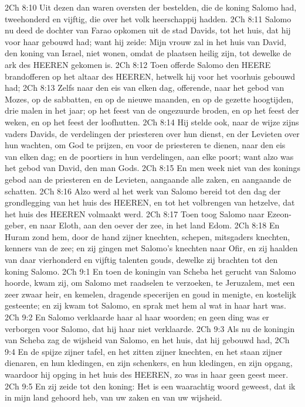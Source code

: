 2Ch 8:10  Uit dezen dan waren oversten der bestelden, die de koning Salomo had, tweehonderd en vijftig, die over het volk heerschappij hadden.
2Ch 8:11  Salomo nu deed de dochter van Farao opkomen uit de stad Davids, tot het huis, dat hij voor haar gebouwd had; want hij zeide: Mijn vrouw zal in het huis van David, den koning van Israel, niet wonen, omdat de plaatsen heilig zijn, tot dewelke de ark des HEEREN gekomen is.
2Ch 8:12  Toen offerde Salomo den HEERE brandofferen op het altaar des HEEREN, hetwelk hij voor het voorhuis gebouwd had;
2Ch 8:13  Zelfs naar den eis van elken dag, offerende, naar het gebod van Mozes, op de sabbatten, en op de nieuwe maanden, en op de gezette hoogtijden, drie malen in het jaar; op het feest van de ongezuurde broden, en op het feest der weken, en op het feest der loofhutten.
2Ch 8:14  Hij stelde ook, naar de wijze zijns vaders Davids, de verdelingen der priesteren over hun dienst, en der Levieten over hun wachten, om God te prijzen, en voor de priesteren te dienen, naar den eis van elken dag; en de poortiers in hun verdelingen, aan elke poort; want alzo was het gebod van David, den man Gods.
2Ch 8:15  En men week niet van des konings gebod aan de priesteren en de Levieten, aangaande alle zaken, en aangaande de schatten.
2Ch 8:16  Alzo werd al het werk van Salomo bereid tot den dag der grondlegging van het huis des HEEREN, en tot het volbrengen van hetzelve, dat het huis des HEEREN volmaakt werd.
2Ch 8:17  Toen toog Salomo naar Ezeon-geber, en naar Eloth, aan den oever der zee, in het land Edom.
2Ch 8:18  En Huram zond hem, door de hand zijner knechten, schepen, mitsgaders knechten, kenners van de zee; en zij gingen met Salomo's knechten naar Ofir, en zij haalden van daar vierhonderd en vijftig talenten gouds, dewelke zij brachten tot den koning Salomo.
2Ch 9:1  En toen de koningin van Scheba het gerucht van Salomo hoorde, kwam zij, om Salomo met raadselen te verzoeken, te Jeruzalem, met een zeer zwaar heir, en kemelen, dragende specerijen en goud in menigte, en kostelijk gesteente; en zij kwam tot Salomo, en sprak met hem al wat in haar hart was.
2Ch 9:2  En Salomo verklaarde haar al haar woorden; en geen ding was er verborgen voor Salomo, dat hij haar niet verklaarde.
2Ch 9:3  Als nu de koningin van Scheba zag de wijsheid van Salomo, en het huis, dat hij gebouwd had,
2Ch 9:4  En de spijze zijner tafel, en het zitten zijner knechten, en het staan zijner dienaren, en hun kledingen, en zijn schenkers, en hun kledingen, en zijn opgang, waardoor hij opging in het huis des HEEREN, zo was in haar geen geest meer.
2Ch 9:5  En zij zeide tot den koning: Het is een waarachtig woord geweest, dat ik in mijn land gehoord heb, van uw zaken en van uw wijsheid.
